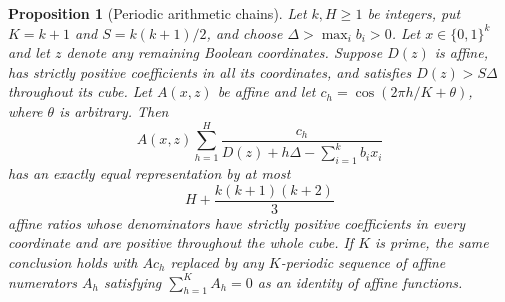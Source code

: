 \documentclass[11pt]{article}
\newtheorem{proposition}{Proposition}
\begin{document}
\begin{proposition}[Periodic arithmetic chains]\label{prop:periodic-chain}
Let $k,H\ge1$ be integers, put $K=k+1$ and $S=k(k+1)/2$, and choose
$\Delta>\max_i b_i>0$. Let $x\in\{0,1\}^k$ and let $z$ denote any
remaining Boolean coordinates. Suppose $D(z)$ is affine, has strictly
positive coefficients in all its coordinates, and satisfies
$D(z)>S\Delta$ throughout its cube. Let $A(x,z)$ be affine and let
$c_h=\cos(2\pi h/K+\theta)$, where $\theta$ is arbitrary. Then
\[
 A(x,z)\sum_{h=1}^H
 \frac{c_h}{D(z)+h\Delta-\sum_{i=1}^k b_i x_i}
\]
has an exactly equal representation by at most
\[
 H+\frac{k(k+1)(k+2)}3
\]
affine ratios whose denominators have strictly positive coefficients
in every coordinate and are positive throughout the whole cube.
If $K$ is prime, the same conclusion holds with $A c_h$ replaced by
any $K$-periodic sequence of affine numerators $A_h$ satisfying
$\sum_{h=1}^K A_h=0$ as an identity of affine functions.
\end{proposition}
\end{document}
